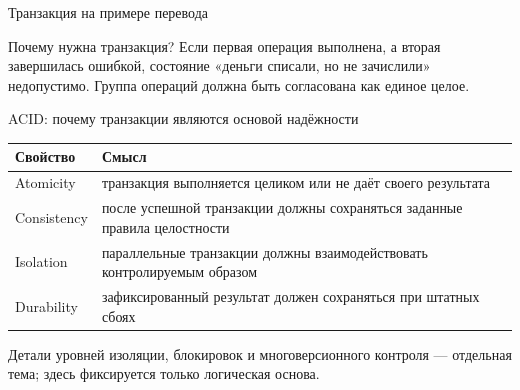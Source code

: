 \documentclass[aspectratio=169]{beamer}
\begin{document}
\begin{frame}{Транзакция на примере перевода}
\begin{center}
\end{center}

\vspace{0.25cm}
\begin{alertblock}{Почему нужна транзакция?}
Если первая операция выполнена, а вторая завершилась ошибкой, состояние «деньги списали,
но не зачислили» недопустимо. Группа операций должна быть согласована как единое целое.
\end{alertblock}
\end{frame}

\begin{frame}{ACID: почему транзакции являются основой надёжности}
\small
\begin{table}
\centering
\begin{tabular}{p{}|p{}}
\toprule
\textbf{Свойство} & \textbf{Смысл}\\
\midrule
Atomicity & транзакция выполняется целиком или не даёт своего результата\\
Consistency & после успешной транзакции должны сохраняться заданные правила целостности\\
Isolation & параллельные транзакции должны взаимодействовать контролируемым образом\\
Durability & зафиксированный результат должен сохраняться при штатных сбоях\\
\bottomrule
\end{tabular}
\end{table}

\vspace{0.2cm}
\footnotesize
Детали уровней изоляции, блокировок и многоверсионного контроля — отдельная тема;
здесь фиксируется только логическая основа.
\end{frame}
\end{document}
